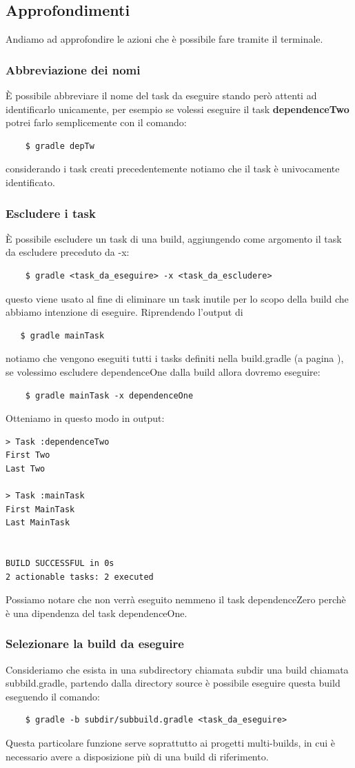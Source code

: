 \subsection{Approfondimenti}
Andiamo ad approfondire le azioni che è possibile fare tramite il terminale.
\subsubsection{Abbreviazione dei nomi}
È possibile abbreviare il nome del task da eseguire stando però attenti ad identificarlo unicamente, per esempio se volessi eseguire il task \textbf{dependenceTwo} potrei farlo semplicemente con il comando:
\begin{verbatim}
    $ gradle depTw \end{verbatim}
considerando i task creati precedentemente notiamo che il task è univocamente identificato.

\subsubsection{Escludere i task}
È possibile escludere un task di una build, aggiungendo come argomento il task da escludere preceduto da -x:
\begin{verbatim}
    $ gradle <task_da_eseguire> -x <task_da_escludere> \end{verbatim}
questo viene usato al fine di eliminare un task inutile per lo scopo della build che abbiamo intenzione di eseguire. Riprendendo l'output di \begin{verbatim}   $ gradle mainTask \end{verbatim} notiamo che vengono eseguiti tutti i tasks definiti nella build.gradle (a pagina \pageref{outMainTask}), se volessimo escludere dependenceOne dalla build allora dovremo eseguire:
\begin{verbatim}
    $ gradle mainTask -x dependenceOne \end{verbatim}
Otteniamo in questo modo in output:
\begin{verbatim}
> Task :dependenceTwo 
First Two
Last Two

> Task :mainTask 
First MainTask
Last MainTask


BUILD SUCCESSFUL in 0s
2 actionable tasks: 2 executed
\end{verbatim}
Possiamo notare che non verrà eseguito nemmeno il task dependenceZero perchè è una dipendenza del task dependenceOne.

\subsubsection{Selezionare la build da eseguire}
Consideriamo che esista in una subdirectory chiamata subdir una build chiamata subbild.gradle, partendo dalla directory source è possibile eseguire questa build eseguendo il comando:
\begin{verbatim}
    $ gradle -b subdir/subbuild.gradle <task_da_eseguire> \end{verbatim}
Questa particolare funzione serve soprattutto ai progetti multi-builds, in cui è necessario avere a disposizione più di una build di riferimento.

